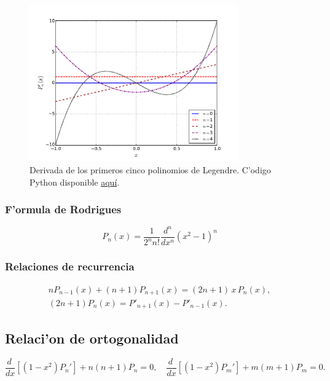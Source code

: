 \begin{figure}[H]
\centering
\includegraphics[angle=0,width=0.8\textwidth]{figs/fig-Legendre-der-P.pdf}
\caption{Derivada de los primeros cinco polinomios de Legendre. C'odigo Python disponible \href{https://github.com/gfrubi/FM2/blob/master/figuras-editables/fig-Legendre.py}{aqu\'i}.}
\label{fig-Pnp}
\end{figure}



\subsubsection{F'ormula de Rodrigues}

\begin{equation}
P_{n}(x)=\frac{1}{2^{n}n!}\frac{d^{n}}{dx^{n}}(x^2-1)^{n}
\end{equation}


\subsubsection{Relaciones de recurrencia}
\begin{gather}
nP_{n-1}(x)+(n+1)P_{n+1}(x)=(2n+1)\,x\,P_n(x), \\
(2n+1)P_n(x)=P'_{n+1}(x)-P'_{n-1}(x).
\end{gather}

\subsection{Relaci'on de ortogonalidad}
\begin{equation}
\frac{d\ }{dx}\left[(1 - x^2) P_n' \right]+ n (n + 1) P_n=0, \quad
\frac{d\ }{dx}\left[(1 - x^2) P_m' \right]+ m (m + 1) P_m=0 .
\end{equation}

